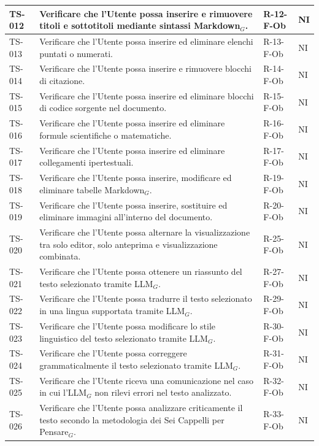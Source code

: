 \documentclass[a4paper, 10pt, colorlinks=true, linkcolor=black, urlcolor=blue, citecolor=blue, hidelinks]{article}
\begin{document}
\begin{longtable}{|p{1.4cm}|p{7.8cm}|p{2.3cm}|p{1.2cm}|}
    \hline
    TS-012 & Verificare che l'Utente possa inserire e rimuovere titoli e sottotitoli mediante sintassi Markdown$_G$. & R-12-F-Ob & NI \\
    \hline
    TS-013 & Verificare che l'Utente possa inserire ed eliminare elenchi puntati o numerati. & R-13-F-Ob & NI \\
    \hline
    TS-014 & Verificare che l'Utente possa inserire e rimuovere blocchi di citazione. & R-14-F-Ob & NI \\
    \hline
    TS-015 & Verificare che l'Utente possa inserire ed eliminare blocchi di codice sorgente nel documento. & R-15-F-Ob & NI \\
    \hline
    TS-016 & Verificare che l'Utente possa inserire ed eliminare formule scientifiche o matematiche. & R-16-F-Ob & NI \\
    \hline
    TS-017 & Verificare che l'Utente possa inserire ed eliminare collegamenti ipertestuali. & R-17-F-Ob & NI \\
    \hline
    TS-018 & Verificare che l'Utente possa inserire, modificare ed eliminare tabelle Markdown$_G$. & R-19-F-Ob & NI \\
    \hline
    TS-019 & Verificare che l'Utente possa inserire, sostituire ed eliminare immagini all'interno del documento. & R-20-F-Ob & NI \\
    \hline
    TS-020 & Verificare che l'Utente possa alternare la visualizzazione tra solo editor, solo anteprima e visualizzazione combinata. & R-25-F-Ob & NI \\
    \hline
    TS-021 & Verificare che l'Utente possa ottenere un riassunto del testo selezionato tramite LLM$_G$. & R-27-F-Ob & NI \\
    \hline
    TS-022 & Verificare che l'Utente possa tradurre il testo selezionato in una lingua supportata tramite LLM$_G$. & R-29-F-Ob & NI \\
    \hline
    TS-023 & Verificare che l'Utente possa modificare lo stile linguistico del testo selezionato tramite LLM$_G$. & R-30-F-Ob & NI \\
    \hline
    TS-024 & Verificare che l'Utente possa correggere grammaticalmente il testo selezionato tramite LLM$_G$. & R-31-F-Ob & NI \\
    \hline
    TS-025 & Verificare che l'Utente riceva una comunicazione nel caso in cui l'LLM$_G$ non rilevi errori nel testo analizzato. & R-32-F-Ob & NI \\
    \hline
    TS-026 & Verificare che l'Utente possa analizzare criticamente il testo secondo la metodologia dei Sei Cappelli per Pensare$_G$. & R-33-F-Ob & NI \\

\end{longtable}
\end{document}
